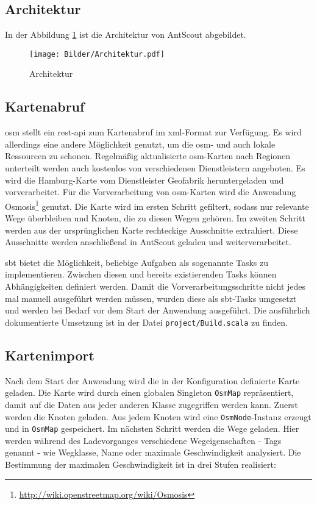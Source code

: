 \subsection{Architektur}
\label{sec:architektur}

In der Abbildung \ref{fig:architektur} ist die Architektur von AntScout abgebildet.

\begin{figure}[htbp]
  \centering
  \texttt{[image: Bilder/Architektur.pdf]}
  \caption{Architektur}
  \label{fig:architektur}
\end{figure}

\subsection{Kartenabruf}
\label{sec:kartenabruf}

\ac{osm} stellt ein \ac{rest}-\ac{api} zum Kartenabruf im \ac{xml}-Format zur Verfügung.
Es wird allerdings eine andere Möglichkeit genutzt, um die \ac{osm}- und auch lokale Ressourcen zu schonen.
Regelmäßig aktualisierte \ac{osm}-Karten nach Regionen unterteilt werden auch kostenlos von verschiedenen Dienstleistern angeboten.
Es wird die Hamburg-Karte vom Dienstleister Geofabrik heruntergeladen und vorverarbeitet.
Für die Vorverarbeitung von \ac{osm}-Karten wird die Anwendung Osmosis\footnote{\url{http://wiki.openstreetmap.org/wiki/Osmosis}} genutzt.
Die Karte wird im ersten Schritt gefiltert, sodass nur relevante Wege überbleiben und Knoten, die zu diesen Wegen gehören.
Im zweiten Schritt werden aus der ursprünglichen Karte rechteckige Ausschnitte extrahiert.
Diese Ausschnitte werden anschließend in AntScout geladen und weiterverarbeitet.

\ac{sbt} bietet die Möglichkeit, beliebige Aufgaben als sogenannte Tasks zu implementieren.
Zwischen diesen und bereits existierenden Tasks können Abhängigkeiten definiert werden.
Damit die Vorverarbeitungsschritte nicht jedes mal manuell ausgeführt werden müssen, wurden diese als \ac{sbt}-Tasks umgesetzt und werden bei Bedarf vor dem Start der Anwendung ausgeführt.
Die ausführlich dokumentierte Umsetzung ist in der Datei \texttt{project/Build.scala} zu finden.

\subsection{Kartenimport}
\label{sec:kartenimport}

Nach dem Start der Anwendung wird die in der Konfiguration definierte Karte geladen.
Die Karte wird durch einen globalen Singleton \texttt{OsmMap} repräsentiert, damit auf die Daten aus jeder anderen Klasse zugegriffen werden kann.
Zuerst werden die Knoten geladen.
Aus jedem Knoten wird eine \texttt{OsmNode}-Instanz erzeugt und in \texttt{OsmMap} gespeichert.
Im nächsten Schritt werden die Wege geladen.
Hier werden während des Ladevorganges verschiedene Wegeigenschaften - Tags genannt - wie Wegklasse, Name oder maximale Geschwindigkeit analysiert.
Die Bestimmung der maximalen Geschwindigkeit ist in drei Stufen realisiert:

